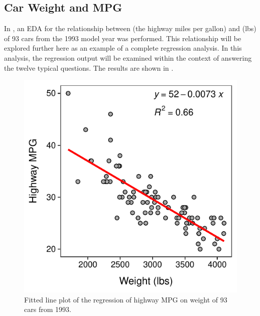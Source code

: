 \documentclass[10pt,openany]{book}\usepackage[]{graphicx}\usepackage[]{color}
\newenvironment{knitrout}{}{} %
\begin{document}
\subsection*{Car Weight and MPG}
In , an EDA for the relationship between  (the highway miles per gallon) and  (lbs) of 93 cars from the 1993 model year was performed. This relationship will be explored further here as an example of a complete regression analysis. In this analysis, the regression output will be examined within the context of answering the twelve typical questions. The results are shown in .

\begin{knitrout}
\color{fgcolor}\begin{figure}[h]

{\centering \includegraphics[width=.4\linewidth]{Figs/CarFit-1} 

}

\caption[Fitted line plot of the regression of highway MPG on weight of 93 cars from 1993]{Fitted line plot of the regression of highway MPG on weight of 93 cars from 1993.}\label{fig:CarFit}
\end{figure}


\end{knitrout}
\end{document}
